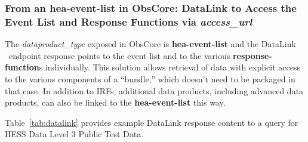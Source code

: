 \subsubsection{From an {\bf hea-event-list} in ObsCore: DataLink to Access the Event List and Response Functions via {\em access\_url\/}}
\label{sec:datalinkinobs}
The {\em dataproduct\_type\/} exposed in ObsCore is {\bf hea-event-list} and the Data\-Link \blinks\ endpoint response  points to the event list and to the various {\bf response-function}s individually. This solution allows retrieval of data with explicit access to the various  components  of a ``bundle,'' which doesn't need to be packaged in that case. In addition to \glspl{IRF}, additional data products, including advanced data products, can also be linked to the {\bf hea-event-list} this way.

Table~\ref{tab:datalink} provides example DataLink response content to a query for \gls{HESS} Data Level 3 Public Test Data.


